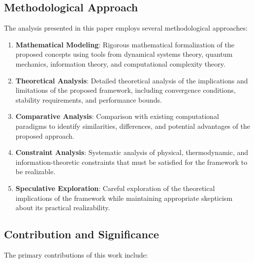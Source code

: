\documentclass[12pt,a4paper]{article}
\theoremstyle{definition}
\begin{document}
\subsection{Methodological Approach}

The analysis presented in this paper employs several methodological approaches:

\begin{enumerate}
\item \textbf{Mathematical Modeling}: Rigorous mathematical formalization of the proposed concepts using tools from dynamical systems theory, quantum mechanics, information theory, and computational complexity theory.

\item \textbf{Theoretical Analysis}: Detailed theoretical analysis of the implications and limitations of the proposed framework, including convergence conditions, stability requirements, and performance bounds.

\item \textbf{Comparative Analysis}: Comparison with existing computational paradigms to identify similarities, differences, and potential advantages of the proposed approach.

\item \textbf{Constraint Analysis}: Systematic analysis of physical, thermodynamic, and information-theoretic constraints that must be satisfied for the framework to be realizable.

\item \textbf{Speculative Exploration}: Careful exploration of the theoretical implications of the framework while maintaining appropriate skepticism about its practical realizability.
\end{enumerate}

\subsection{Contribution and Significance}

The primary contributions of this work include:
\end{document}
